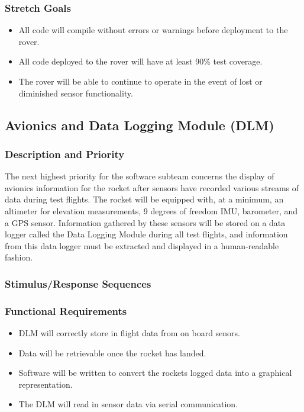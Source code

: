 \documentclass[onecolumn, draftclsnofoot, 10pt, compsoc]{IEEEtran}
\begin{document}
\subsubsection{Stretch Goals}
\begin{itemize}
\item All code will compile without errors or warnings before deployment to the rover.
\item All code deployed to the rover will have at least 90\% test coverage.
\item The rover will be able to continue to operate in the event of lost or diminished sensor functionality.
\end{itemize}


\subsection{Avionics and Data Logging Module (DLM)}
\subsubsection{Description and Priority}
The next highest priority for the software subteam concerns the display of avionics information for the rocket after sensors have recorded various streams of data during test flights.
The rocket will be equipped with, at a minimum, an altimeter for elevation measurements, 9 degrees of freedom IMU, barometer, and a GPS sensor. Information gathered by these sensors will be stored on a data logger called the Data Logging Module during all test flights, and information from this data logger must be extracted and displayed in a human-readable fashion. 
\subsubsection{Stimulus/Response Sequences}

\subsubsection{Functional Requirements}
\begin{itemize}
\item DLM will correctly store in flight data from on board senors.
\item Data will be retrievable once the rocket has landed.
\item Software will be written to convert the rockets logged data into a graphical representation.
\item The DLM will read in sensor data via serial communication.
\end{itemize}
\end{document}
